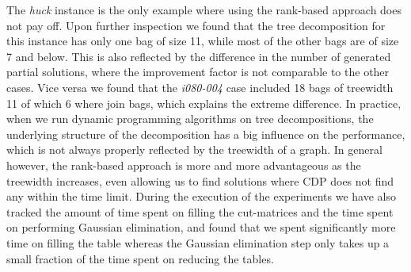 \documentclass{llncs}
\begin{document}
\begin{table}[!h]
\caption{Number of generated partial solutions for graphs from TreewidthLib}
\label{t2:c}
\end{table}

The \emph{huck} instance is the only example where using the rank-based approach does not pay off.
Upon further inspection we found that the tree decomposition for this instance has only one bag of size 11, while most of the other bags are of size 7 and below. This is also reflected by the difference in the number
of generated partial solutions, where the improvement factor is not comparable to the other cases. Vice versa we found that the \emph{i080-004} case included 18 bags of treewidth 11 of which 6 where join bags, which explains the extreme difference. In practice, when we run dynamic programming algorithms on tree decompositions, the underlying structure of the decomposition has a big influence on the performance, which is not always properly reflected by the treewidth of a graph. In general however, the rank-based approach is more and more advantageous as the
treewidth increases, even allowing us to find solutions where CDP does not
find any within the time limit. During the execution of the experiments we have also tracked the amount of time spent on filling the cut-matrices and the time spent on performing Gaussian elimination, and found that we spent significantly more time on filling the table whereas the Gaussian elimination step only takes up a small fraction of the time spent on reducing the tables.
\end{document}
